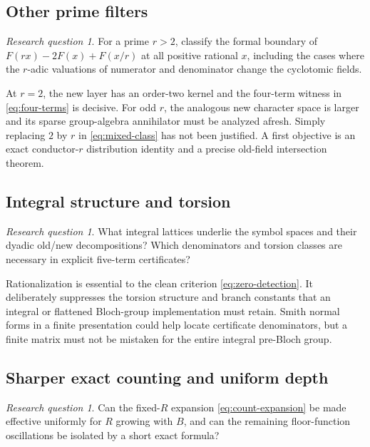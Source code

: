 \documentclass[11pt]{article}
\numberwithin{equation}{section}
\theoremstyle{definition}
\theoremstyle{remark}
\newtheorem{question}[theorem]{Research question}
\begin{document}
\subsection{Other prime filters}

\begin{question}\label{question:prime-filter}
For a prime $r>2$, classify the formal boundary of
$F(rx)-2F(x)+F(x/r)$ at all positive rational $x$, including the cases
where the $r$-adic valuations of numerator and denominator change the
cyclotomic fields.
\end{question}

At $r=2$, the new layer has an order-two kernel and the four-term witness
in \eqref{eq:four-terms} is decisive. For odd $r$, the analogous new
character space is larger and its sparse group-algebra annihilator must
be analyzed afresh. Simply replacing $2$ by $r$ in
\eqref{eq:mixed-class} has not been justified. A first objective is an
exact conductor-$r$ distribution identity and a precise old-field
intersection theorem.

\subsection{Integral structure and torsion}

\begin{question}\label{question:integral}
What integral lattices underlie the symbol spaces and their dyadic
old/new decompositions? Which denominators and torsion classes are
necessary in explicit five-term certificates?
\end{question}

Rationalization is essential to the clean criterion
\eqref{eq:zero-detection}. It deliberately suppresses the torsion
structure and branch constants that an integral or flattened Bloch-group
implementation must retain. Smith normal forms in a finite
presentation could help locate certificate denominators, but a finite
matrix must not be mistaken for the entire integral pre-Bloch group.

\subsection{Sharper exact counting and uniform depth}

\begin{question}\label{question:counting}
Can the fixed-$R$ expansion \eqref{eq:count-expansion} be made effective
uniformly for $R$ growing with $B$, and can the remaining floor-function
oscillations be isolated by a short exact formula?
\end{question}
\end{document}
